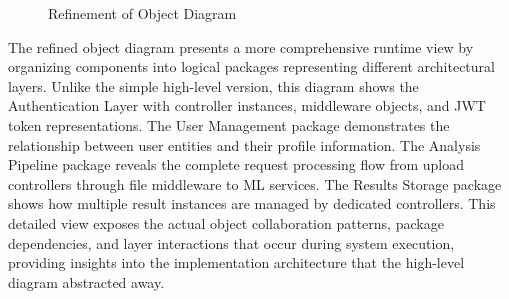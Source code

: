 \begin{enumerate}[label=\roman*.]
\begin{center}
\begin{figure}[H]
                  \caption{Refinement of Object Diagram}
                  \label{fig:RefinementofObjectDiagram}
              \end{figure}
          \end{center}
          The refined object diagram presents a more comprehensive runtime view by organizing components into logical packages representing different architectural layers. Unlike the simple high-level version, this diagram shows the Authentication Layer with controller instances, middleware objects, and JWT token representations. The User Management package demonstrates the relationship between user entities and their profile information. The Analysis Pipeline package reveals the complete request processing flow from upload controllers through file middleware to ML services. The Results Storage package shows how multiple result instances are managed by dedicated controllers. This detailed view exposes the actual object collaboration patterns, package dependencies, and layer interactions that occur during system execution, providing insights into the implementation architecture that the high-level diagram abstracted away.


\end{enumerate}
